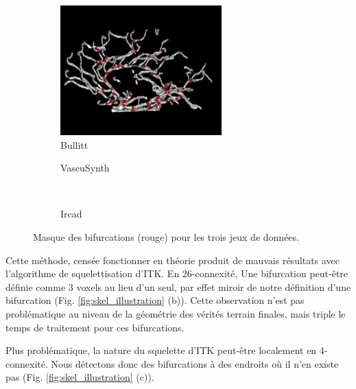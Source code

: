 \begin{figure}[!ht]
  \captionsetup[subfigure]{justification=centering}
  \begin{subfigure}{0.45\textwidth}
    \centering
    \includegraphics[height=5cm]{Images/bifurcations_bullitt.png}
    \caption{Bullitt}
  \end{subfigure}
  \begin{subfigure}{0.45\textwidth}
    \centering
    \caption{VascuSynth}
  \end{subfigure}
  \\
  \centering
  \begin{subfigure}{0.45\textwidth}
    \centering
    \caption{Ircad}
  \end{subfigure}
  \caption{Masque des bifurcations (rouge) pour les trois jeux de données.}
  \label{fig:bifurcations_masks}
\end{figure}

Cette méthode, censée fonctionner en théorie produit de mauvais résultats avec l'algorithme de squelettisation d'ITK. En 26-connexité, Une bifurcation peut-être définie comme 3 voxels au lieu d'un seul, par effet miroir de notre définition d'une bifurcation (Fig. \ref{fig:skel_illustration} (b)). Cette observation n'est pas problématique au niveau de la géométrie des vérités terrain finales, mais triple le temps de traitement pour ces bifurcations.

Plus problématique, la nature du squelette d'ITK peut-être localement en 4-connexité. Nous détectons donc des bifurcations à des endroits où il n'en existe pas (Fig. \ref{fig:skel_illustration} (c)). 

